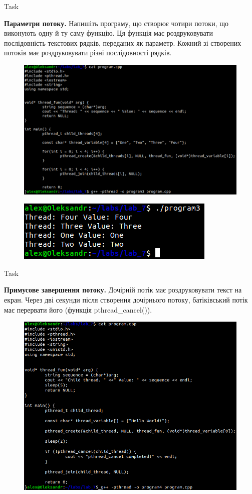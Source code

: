 \documentclass[a4paper,12pt]{article}
\newcommand{\RomanNumeralCaps}[1]{\MakeUppercase{\romannumeral #1}}
\begin{document}
\newpage
    \begin{center}
        \Large{Task \RomanNumeralCaps{3}}
    \end{center}
    \textbf{Параметри потоку.} Напишіть програму, що створює чотири потоки, що виконують одну й ту саму функцію.
    Ця функція має роздруковувати послідовність текстових рядків, переданих як параметр. Кожний зі створених
    потоків має роздруковувати різні послідовності рядків.
    \begin{figure}[h!]
        \begin{minipage}[h]{1\linewidth}
            \centering
            \includegraphics[width=0.6\linewidth]{Prt sc/Figure_3_1.png}  
        \end{minipage}
    \end{figure}
    \begin{figure}[h!]
        \begin{minipage}[h]{1\linewidth}
            \centering
            \includegraphics[width=0.6\linewidth]{Prt sc/Figure_3_2.png}  
        \end{minipage}
    \end{figure}
    \begin{center}
        \Large{Task \RomanNumeralCaps{4}}
    \end{center}
    \textbf{Примусове завершення потоку.} Дочірній потік має роздруковувати текст на екран. Через дві секунди після
    створення дочірнього потоку, батіківський потік має перервати його (функція pthread\_cancel()).
    \begin{figure}[h!]
        \begin{minipage}[h]{1\linewidth}
            \centering
            \includegraphics[width=0.6\linewidth]{Prt sc/Figure_4_1.png}  
        \end{minipage}
    \end{figure}
\end{document}
